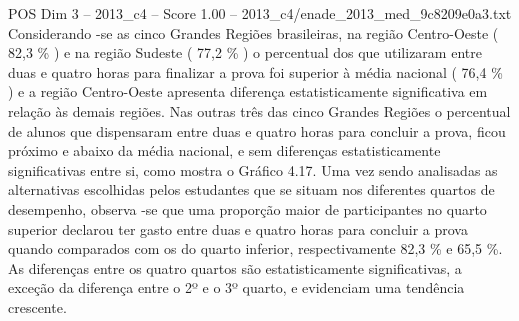 \begin{textsample}{POS Dim 3 – 2013\_c4 – Score 1.00 – 2013\_c4/enade\_2013\_med\_9c8209e0a3.txt}
Considerando -se as cinco Grandes Regiões brasileiras, na região Centro-Oeste ( 82,3 \% ) e na região Sudeste ( 77,2 \% ) o percentual dos que utilizaram entre duas e quatro horas para finalizar a prova foi superior à média nacional ( 76,4 \% ) e a região Centro-Oeste apresenta diferença estatisticamente significativa em relação às demais regiões.
Nas outras três das cinco Grandes Regiões o percentual de alunos que dispensaram entre duas e quatro horas para concluir a prova, ficou próximo e abaixo da média nacional, e sem diferenças estatisticamente significativas entre si, como mostra o Gráfico 4.17.
Uma vez sendo analisadas as alternativas escolhidas pelos estudantes que se situam nos diferentes quartos de desempenho, observa -se que uma proporção maior de participantes no quarto superior declarou ter gasto entre duas e quatro horas para concluir a prova quando comparados com os do quarto inferior, respectivamente 82,3 \% e 65,5 \%.
As diferenças entre os quatro quartos são estatisticamente significativas, a exceção da diferença entre o 2º e o 3º quarto, e evidenciam uma tendência crescente.

\end{textsample}
